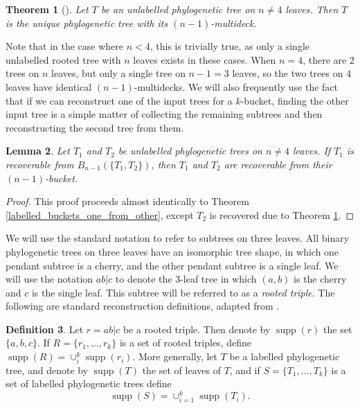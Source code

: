 \documentclass[12pt]{article}
\newtheorem{Theorem}{Theorem}[section]
\newtheorem{Lemma}[Theorem]{Lemma}
\theoremstyle{definition}
\newtheorem{Definition}[Theorem]{Definition}
\DeclareMathOperator{\supp}{supp}
\begin{document}
\begin{Theorem}[\cite{Decks_of_rooted_binary_trees}]\label{reconstruct_from_n-1_multideck}
    Let $T$ be an unlabelled phylogenetic tree on $n \neq 4$ leaves. Then $T$ is the unique phylogenetic tree with its $(n-1)$-multideck.
\end{Theorem}

Note that in the case where $n < 4$, this is trivially true, as only a single unlabelled rooted tree with $n$ leaves exists in these cases. When $n=4$, there are 2 trees on $n$ leaves, but only a single tree on $n-1=3$ leaves, so the two trees on $4$ leaves have identical $(n-1)$-multidecks.
We will also frequently use the fact that if we can reconstruct one of the input trees for a $k$-bucket, finding the other input tree is a simple matter of collecting the remaining subtrees and then reconstructing the second tree from them.

\begin{Lemma}\label{unlabelled_buckets_one_from_other}
    Let $T_1$ and $T_2$ be unlabelled phylogenetic trees on $n \ne 4$ leaves. If $T_1$ is recoverable from $B_{n-1}(\{T_1, T_2\})$, then $T_1$ and $T_2$ are recoverable from their $(n-1)$-bucket.
\end{Lemma}

\begin{proof}
This proof proceeds almost identically to Theorem \ref{labelled_buckets_one_from_other}, except $T_2$ is recovered due to Theorem \ref{reconstruct_from_n-1_multideck}.
\end{proof}

We will use the standard notation to refer to subtrees on three leaves. All binary phylogenetic trees on three leaves have an isomorphic tree shape, in which one pendant subtree is a cherry, and the other pendant subtree is a single leaf. We will use the notation $ab|c$ to denote the $3$-leaf tree in which $(a,b)$ is the cherry and $c$ is the single leaf. This subtree will be referred to as a \emph{rooted triple}. The following are standard reconstruction definitions, adapted from \cite{bryant1995extension}.


\begin{Definition}
    Let $r = ab|c$ be a rooted triple. Then denote by $\supp(r)$ the set $\{a,b,c\}$. If $R=\{r_1, \dots, r_k\}$ is a set of rooted triples, define $\supp(R)=\cup_i^k \supp(r_i)$. More generally, let $T$ be a labelled phylogenetic tree, and denote by $\supp(T)$ the set of leaves of $T$, and if $S=\{T_1,\dots,T_k\}$ is a set of labelled phylogenetic trees define 
    \[\supp(S)=\cup_{i=1}^k \supp(T_i).\]
\end{Definition}
\end{document}
